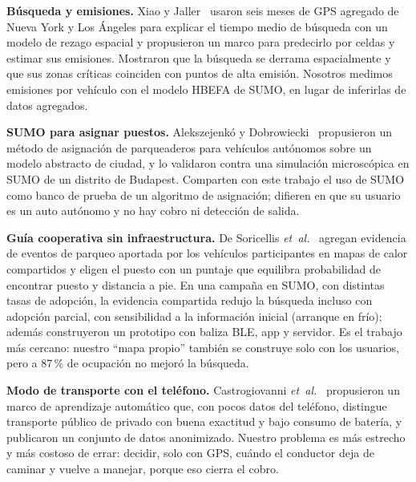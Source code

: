 \documentclass[conference]{IEEEtran}
\begin{document}
\textbf{Búsqueda y emisiones.} Xiao y Jaller~\cite{xiao2025prediction} usaron seis meses de GPS agregado de Nueva York y Los Ángeles para explicar el tiempo medio de búsqueda con un modelo de rezago espacial y propusieron un marco para predecirlo por celdas y estimar sus emisiones. Mostraron que la búsqueda se derrama espacialmente y que sus zonas críticas coinciden con puntos de alta emisión. Nosotros medimos emisiones por vehículo con el modelo HBEFA de SUMO, en lugar de inferirlas de datos agregados.

\textbf{SUMO para asignar puestos.} Alekszejenkó y Dobrowiecki~\cite{alekszejenko2022validating} propusieron un método de asignación de parqueaderos para vehículos autónomos sobre un modelo abstracto de ciudad, y lo validaron contra una simulación microscópica en SUMO de un distrito de Budapest. Comparten con este trabajo el uso de SUMO como banco de prueba de un algoritmo de asignación; difieren en que su usuario es un auto autónomo y no hay cobro ni detección de salida.

\textbf{Guía cooperativa sin infraestructura.} De Soricellis \emph{et~al.}~\cite{desoricellis2026cooperative} agregan evidencia de eventos de parqueo aportada por los vehículos participantes en mapas de calor compartidos y eligen el puesto con un puntaje que equilibra probabilidad de encontrar puesto y distancia a pie. En una campaña en SUMO, con distintas tasas de adopción, la evidencia compartida redujo la búsqueda incluso con adopción parcial, con sensibilidad a la información inicial (arranque en frío); además construyeron un prototipo con baliza BLE, app y servidor. Es el trabajo más cercano: nuestro ``mapa propio'' también se construye solo con los usuarios, pero a 87\,\% de ocupación no mejoró la búsqueda.

\textbf{Modo de transporte con el teléfono.} Castrogiovanni \emph{et~al.}~\cite{castrogiovanni2020smartphone} propusieron un marco de aprendizaje automático que, con pocos datos del teléfono, distingue transporte público de privado con buena exactitud y bajo consumo de batería, y publicaron un conjunto de datos anonimizado. Nuestro problema es más estrecho y más costoso de errar: decidir, solo con GPS, cuándo el conductor deja de caminar y vuelve a manejar, porque eso cierra el cobro.
\end{document}
